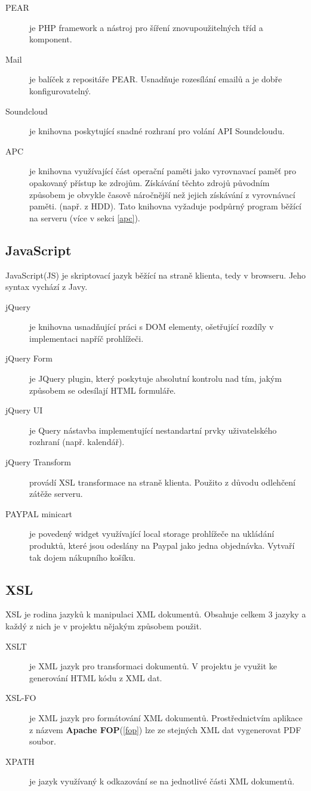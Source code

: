 \documentclass[12pt]{article}
\begin{document}
\begin{description}
\item[PEAR] je PHP framework a nástroj pro šíření znovupoužitelných tříd a komponent.
\item[Mail] je balíček z repositáře PEAR. Usnadňuje rozesílání emailů a je dobře konfigurovatelný.
\item[Soundcloud] je knihovna poskytující snadné rozhraní pro volání API Soundcloudu.
\item[APC] je knihovna využívající část operační paměti jako vyrovnavací paměť pro opakovaný přístup ke zdrojům. Získávání těchto zdrojů původním způsobem je obvykle časově náročnější než jejich získávání z vyrovnávací paměti. (např. z HDD). Tato knihovna vyžaduje podpůrný program běžící na serveru (více v sekci \ref{apc}).
\end{description}

\subsection{JavaScript}
JavaScript(JS) je skriptovací jazyk běžící na straně klienta, tedy v browseru. Jeho syntax vychází z Javy.

\begin{description}
\item[jQuery] je knihovna usnadňující práci s DOM elementy, ošetřující rozdíly v implementaci napříč prohlížeči.
\item[jQuery Form] je JQuery plugin, který poskytuje absolutní kontrolu nad tím, jakým způsobem se odesílají HTML formuláře.
\item[jQuery UI] je Query nástavba implementující nestandartní prvky uživatelského rozhraní (např. kalendář).
\item[jQuery Transform] provádí XSL transformace na straně klienta. Použito z důvodu odlehčení zátěže serveru.
\item[PAYPAL minicart] je povedený widget využívající local storage prohlížeče na ukládání produktů, které jsou odeslány na Paypal jako jedna objednávka. Vytvaří tak dojem nákupního košíku.
\end{description}

\subsection{XSL}
XSL\cite{w3cXSL} je rodina jazyků k manipulaci XML dokumentů. Obsahuje celkem 3 jazyky a každý z nich je v projektu nějakým způsobem použit.
\begin{description}
\item[XSLT] je XML jazyk pro transformaci dokumentů. V projektu je využit ke generování HTML kódu z XML dat.
\item[XSL-FO] je XML jazyk pro formátování XML dokumentů. Prostřednictvím aplikace z názvem \textbf{Apache FOP}(\ref{fop}) lze ze stejných XML dat vygenerovat PDF soubor.
\item[XPATH] je jazyk využívaný k odkazování se na jednotlivé části XML dokumentů.
\end{description}
\end{document}
